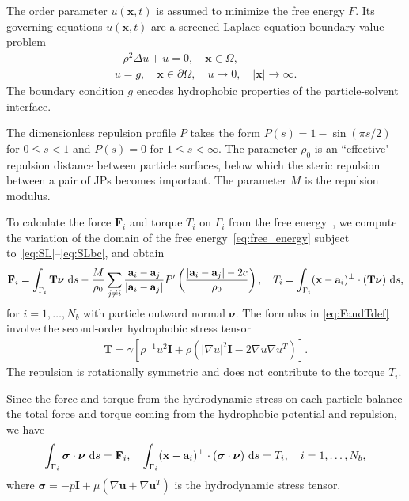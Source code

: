\documentclass[prb,preprint,showpacs,preprintnumbers,amsmath,amssymb,longbibliography]{revtex4-1}
\renewcommand{\aa}{\mathbf{a}}
\newcommand{\bd}{\partial}
\newcommand{\FF}{\mathbf{F}}
\newcommand{\nnu}{\boldsymbol{\nu}}
\newcommand{\ssigma}{\boldsymbol{\sigma}}
\newcommand{\xx}{\mathbf{x}}
\newcommand{\uu}{\mathbf{u}}
\begin{document}
The order parameter $u(\xx,t)$ is assumed to minimize the free energy
$F$. Its governing equations $u(\xx,t)$ are a screened Laplace equation
boundary value problem
\begin{gather}
  \label{eq:SL}
  -\rho^2 \Delta u + u = 0,\quad \xx \in \Omega, \\
  \label{eq:SLbc}
  u = g, \quad \xx \in \bd\Omega, \quad 
  u \rightarrow 0, \quad |\xx| \rightarrow \infty.
\end{gather}
The boundary condition $g$ encodes hydrophobic properties of the
particle-solvent interface.

The dimensionless repulsion profile $P$ takes the form $P(s) = 1 -
\sin(\pi s/2)$ for $0 \leq s < 1$ and $P(s) = 0$ for $1 \leq s <
\infty$. The parameter $\rho_0$ is an ``effective" repulsion distance between
particle surfaces, below which the steric repulsion between a pair of
JPs becomes important. The parameter $M$ is the repulsion modulus.

To calculate the force $\FF_i$ and torque $T_i$ on $\Gamma_i$ from the
free energy~\cite{Fu20}, we compute the variation of the domain of the
free energy~\eqref{eq:free_energy} subject
to~\eqref{eq:SL}--\eqref{eq:SLbc}, and obtain 
\begin{align}
  \label{eq:FandTdef}
  \FF_i = \int_{\Gamma_i} \mathbf{T}\nnu \, \dif s
  - \frac{M}{\rho_0}
  \sum_{j \neq i}
  \frac{\aa_i - \aa_j}{|\aa_i - \aa_j|}
P'\left(\frac{|\aa_i - \aa_j|-2c}{\rho_0}\right)
  ,\quad
T_i = \int_{\Gamma_i} (\xx - \aa_i)^{\perp}\cdot (\mathbf{T}\nnu) \, \dif s, 
\end{align}
for $i = 1,\ldots,N_b$ with particle outward normal $\nnu$.  The formulas
in \eqref{eq:FandTdef} involve the second-order hydrophobic stress tensor
\begin{align}
\mathbf{T} = \gamma \left[ \rho^{-1} u^2 \mathbf{I}
  + \rho \left(|\nabla u|^2 \mathbf{I} - 2\nabla u \nabla u^T\right)\right].
\end{align}
The repulsion is rotationally symmetric and
does not contribute to the torque $T_i$.

Since the force and torque from the hydrodynamic stress on each particle
balance the total force and torque coming from the hydrophobic potential
and repulsion, we have
\begin{equation}
  \label{eq:force}
 \int_{\Gamma_i} \ssigma \cdot \nnu \, \dif s = \FF_i, \quad
 \int_{\Gamma_i} (\xx - \aa_i)^\perp \cdot 
  (\ssigma \cdot \nnu) \, \dif s = T_i,
  \quad i=1,\ldots,N_b,
\end{equation}
where $\ssigma = -p \mathbf{I} + \mu \left(\nabla \uu + \nabla \uu^T
\right)$ is the hydrodynamic stress tensor.
\end{document}
